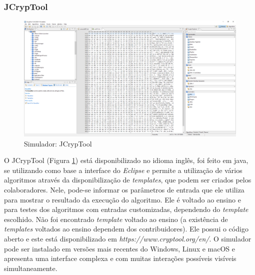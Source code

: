 
\subsubsection{JCrypTool}

\begin{figure}[H]
    \centering
    \caption{Simulador: JCrypTool}
    \label{fig:jcryptool}
    \includegraphics[width=1.2\linewidth,center]{Simuladores/JCrypTool.png}
\end{figure}

O JCrypTool (Figura \ref{fig:jcryptool}) está disponibilizado no idioma inglês, foi feito em java, se utilizando como base a interface do \textit{Eclipse} e permite a utilização de vários algoritmos através da disponibilização de \textit{templates}, que podem ser criados pelos colaboradores. Nele, pode-se informar os parâmetros de entrada que ele utiliza para mostrar o resultado da execução do algoritmo. Ele é voltado ao ensino e para testes dos algoritmos com entradas customizadas, dependendo do \textit{template} escolhido. Não foi encontrado \textit{template} voltado ao ensino (a existência de \textit{templates} voltados ao ensino dependem dos contribuidores). Ele possui o código aberto e este está disponibilizado em \textit{https://www.cryptool.org/en/}. O simulador pode ser instalado em versões mais recentes do Windows, Linux e macOS e apresenta uma interface complexa e com muitas interações possíveis visíveis simultaneamente. \cite{cryptool16}

